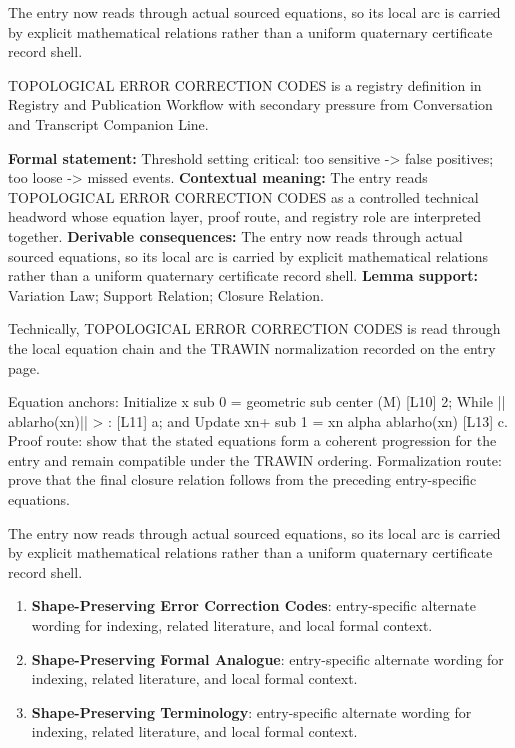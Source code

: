 The entry now reads through actual sourced equations, so its local arc is carried by explicit mathematical relations rather than a uniform quaternary certificate record shell.
\clearpage


\begingroup\small
{}
TOPOLOGICAL ERROR CORRECTION CODES is a registry definition in Registry and Publication Workflow with secondary pressure from Conversation and Transcript Companion Line.

\begingroup\footnotesize\setlength{\emergencystretch}{3em}\sloppy
\textbf{Formal statement:} Threshold setting critical: too sensitive -> false positives; too loose -> missed events. \textbf{Contextual meaning:} The entry reads TOPOLOGICAL ERROR CORRECTION CODES as a controlled technical headword whose equation layer, proof route, and registry role are interpreted together. \textbf{Derivable consequences:} The entry now reads through actual sourced equations, so its local arc is carried by explicit mathematical relations rather than a uniform quaternary certificate record shell. \textbf{Lemma support:} Variation Law; Support Relation; Closure Relation.\par
\endgroup

Technically, TOPOLOGICAL ERROR CORRECTION CODES is read through the local equation chain and the TRAWIN normalization recorded on the entry page.

Equation anchors: Initialize x sub 0 = geometric sub center (M) [L10] 2; While || ablarho(xn)|| >  : [L11] a; and Update xn+ sub 1 = xn   alpha ablarho(xn) [L13] c. Proof route: show that the stated equations form a coherent progression for the entry and remain compatible under the TRAWIN ordering. Formalization route: prove that the final closure relation follows from the preceding entry-specific equations.

The entry now reads through actual sourced equations, so its local arc is carried by explicit mathematical relations rather than a uniform quaternary certificate record shell.
\endgroup

\begin{enumerate}[leftmargin=1.6em,itemsep=6pt,topsep=4pt]
\item \textbf{Shape-Preserving Error Correction Codes}: entry-specific alternate wording for indexing, related literature, and local formal context.
\item \textbf{Shape-Preserving Formal Analogue}: entry-specific alternate wording for indexing, related literature, and local formal context.
\item \textbf{Shape-Preserving Terminology}: entry-specific alternate wording for indexing, related literature, and local formal context.
\end{enumerate}

